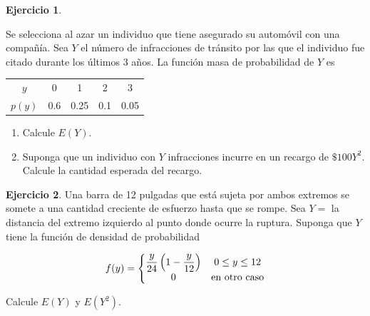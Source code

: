 \documentclass[
  11pt,
]{book}
\providecommand{\tightlist}{%
  \setlength{\itemsep}{0pt}\setlength{\parskip}{0pt}}
\theoremstyle{definition}
\theoremstyle{definition}
\theoremstyle{definition}
\newtheorem{exercise}{Ejercicio}[chapter]
\theoremstyle{definition}
\theoremstyle{remark}
\begin{document}
\begin{exercise}
\protect\hypertarget{exr:exesperanza3}{}\label{exr:exesperanza3}

Se selecciona al azar un individuo que tiene asegurado su automóvil con una compañía. Sea \(Y\) el número de infracciones de tránsito por las que el individuo fue citado durante los últimos 3 años. La función masa de probabilidad de \(Y\) es

\begin{table}[H]
\centering
\begin{tabular}[t]{ccccc}
\toprule
$y$ & 0 & 1 & 2 & 3\\
$p(y)$ & 0.6 & 0.25 & 0.1 & 0.05\\
\bottomrule
\end{tabular}
\end{table}

\begin{enumerate}
\def\labelenumi{\arabic{enumi}.}
\tightlist
\item
  Calcule \(E(Y)\).
\item
  Suponga que un individuo con \(Y\) infracciones incurre en un recargo de \(\$100Y^2\). Calcule la cantidad esperada del recargo.
\end{enumerate}

\end{exercise}

\begin{exercise}
\protect\hypertarget{exr:exesperanza4}{}\label{exr:exesperanza4}Una barra de 12 pulgadas que está sujeta por ambos extremos se somete a una cantidad creciente de esfuerzo hasta que se rompe. Sea \(Y =\) la distancia del extremo izquierdo al punto donde ocurre la ruptura. Suponga que \(Y\) tiene la función de densidad de probabilidad

\begin{equation}
\notag
f(y) = \left\lbrace
\begin{matrix}
\displaystyle\frac{y}{24}\left( 1 -\displaystyle\frac{y}{12}  \right) & 0\leq y \leq 12\\
0 & \text{en otro caso}
\end{matrix}
\right.
\end{equation}

Calcule \(E(Y)\) y \(E(Y^2)\).
\end{exercise}
\end{document}
